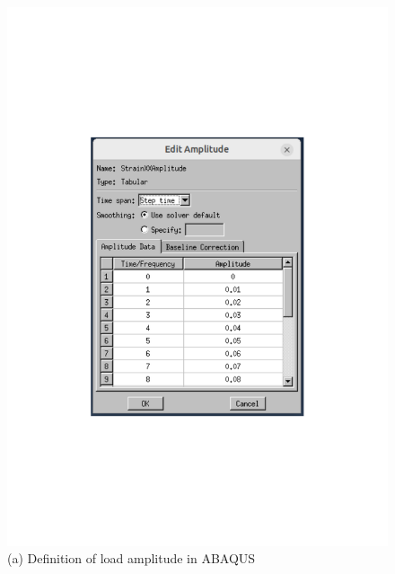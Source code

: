  

     \begin{figure}[H]
        \centering
        \begin{minipage}[T!]{1.0\textwidth}
            \centering
            \begin{minipage}[T!][9cm][T!]{0.35\textwidth}
                \includegraphics[width=1.0\textwidth]{Amplitude.pdf}
                \vfill{}
                \caption*{(a) Definition of load amplitude in ABAQUS}
                \label{fig:amplitudemenu}
            \end{minipage}
            \hspace{0.08\textwidth} %
            \begin{minipage}[T!][9cm][T!]{0.35\textwidth}

\end{minipage}
\end{minipage}
\end{figure}
